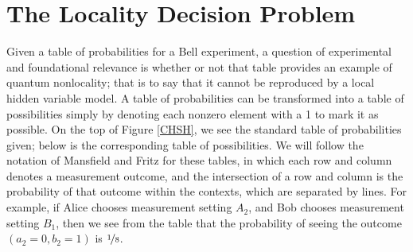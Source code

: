 \documentclass[reprint]{revtex4-1}
\theoremstyle{definition}
\begin{document}
\section{The Locality Decision Problem}

Given a table of probabilities for a Bell experiment, a question of experimental and foundational relevance is whether or not that table provides an example of quantum nonlocality; that is to say that it cannot be reproduced by a local hidden variable model. A table of probabilities can be transformed into a table of possibilities simply by denoting each nonzero element with a 1 to mark it as possible. On the top of Figure \ref{CHSH}, we see the standard table of probabilities given; below is the corresponding table of possibilities. We will follow the notation of Mansfield and Fritz for these tables, in which each row and column denotes a measurement outcome, and the intersection of a row and column is the probability of that outcome within the contexts, which are separated by lines. For example, if Alice chooses measurement setting $A_2$, and Bob chooses measurement setting $B_1$, then we see from the table that the probability of seeing the outcome $(a_2=0, b_2=1)$ is $\nicefrac18$.
\end{document}

